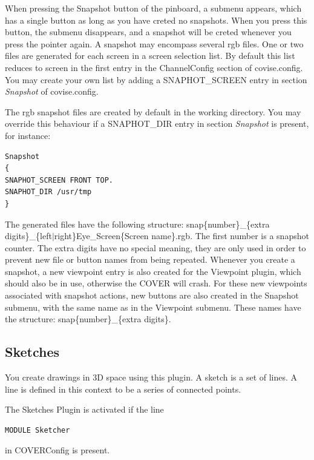 When pressing the Snapshot button of the pinboard,
a submenu appears, which has a single button as long
as you have creted no snapshots. When you press this button,
the submenu disappears, and a snapshot will be creted whenever
you press the pointer again. A snapshot may encompass several rgb
files. One or two files are generated for each screen in a screen 
selection list.
By default this list reduces to screen in the first entry in the
ChannelConfig section of covise.config. You may create your own list
by adding a SNAPHOT\_SCREEN entry in section {\sl Snapshot}
of covise.config.

The rgb snapshot files are created by default in the working
directory. You may override this behaviour if a SNAPHOT\_DIR
entry in section {\sl Snapshot} is present, for instance:
\begin{verbatim}
Snapshot
{
SNAPHOT_SCREEN FRONT TOP.
SNAPHOT_DIR /usr/tmp
}
\end{verbatim}

The generated files have the following structure:\newline
snap\{number\}\_\{extra digits\}\_\{left$\mid $right\}Eye\_Screen\{Screen name\}.rgb.
The first number is a snapshot counter. The extra digits have no special
meaning, they are only used in order to prevent new file or button
names from being repeated. Whenever you create a snapshot, a new
viewpoint entry is also created for the Viewpoint plugin, which
should also be in use, otherwise the COVER will crash.
For these new viewpoints associated with snapshot actions,
new buttons are also created in the Snapshot submenu, with
the same name as in the Viewpoint submenu. These names
have the structure: snap\{number\}\_\{extra digits\}.

\subsection{Sketches}

You create drawings in 3D space using this plugin. A sketch is a set of lines.
A line is defined in this context to be a series of connected points.

The Sketches Plugin is activated if the line  
\begin{verbatim}
MODULE Sketcher
\end{verbatim}
in COVERConfig is present.


